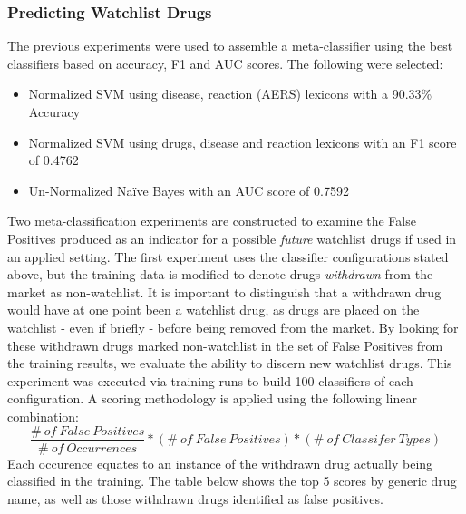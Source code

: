 \documentclass[twoside,11pt]{article}
\begin{document}
\subsubsection{Predicting Watchlist Drugs}
The previous experiments were used to assemble a meta-classifier using the best classifiers based on accuracy, F1 and AUC scores. The following were selected:
\begin{itemize}
  \item Normalized SVM using disease, reaction (AERS) lexicons with a 90.33\% Accuracy
  \item Normalized SVM using drugs, disease and reaction lexicons with an F1 score of 0.4762
  \item Un-Normalized Na\"ive Bayes with an AUC score of 0.7592
\end{itemize}
Two meta-classification experiments are constructed to examine the False Positives produced as an indicator for a possible \textit{future} watchlist drugs if used in an applied setting. The first experiment uses the classifier configurations stated above, but the training data is modified to denote drugs \textit{withdrawn} from the market as non-watchlist. It is important to distinguish that a withdrawn drug would have at one point been a watchlist drug, as drugs are placed on the watchlist - even if briefly - before being removed from the market. By looking for these withdrawn drugs marked non-watchlist in the set of False Positives from the training results, we evaluate the ability to discern new watchlist drugs. This experiment was executed via training runs to build 100 classifiers of each configuration. A scoring methodology is applied using the following linear combination:
\[
  \frac{\#\ of\ False\ Positives}{\#\ of\ Occurrences} * (\#\ of\ False\ Positives) * (\#\ of\ Classifer\ Types)
\]
Each occurence equates to an instance of the withdrawn drug actually being classified in the training. The table below shows the top 5 scores by generic drug name, as well as those withdrawn drugs identified as false positives.
\end{document}
